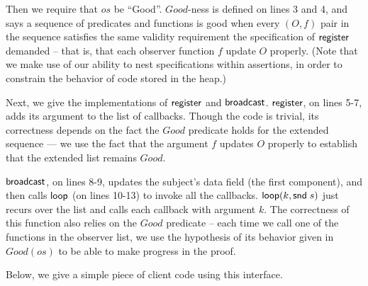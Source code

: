 Then we require that $os$ be ``Good''. $Good$-ness is defined on lines
3 and 4, and says a sequence of predicates and functions is good when
every $(O,f)$ pair in the sequence satisfies the same validity
requirement the specification of $\mathsf{register}$ demanded -- that
is, that each observer function $f$ update $O$ properly.  (Note that
we make use of our ability to nest specifications within assertions,
in order to constrain the behavior of code stored in the heap.)

Next, we give the implementations of $\mathsf{register}$ and
$\mathsf{broadcast}$. $\mathsf{register}$, on lines 5-7, adds its
argument to the list of callbacks. Though the code is trivial, its
correctness depends on the fact the $Good$ predicate holds for the
extended sequence --- we use the fact that the argument $f$ updates 
$O$ properly to establish that the extended list remains $Good$. 

$\mathsf{broadcast}$, on lines 8-9, updates the subject's data field
(the first component), and then calls $\mathsf{loop}$ (on lines 10-13)
to invoke all the callbacks. $\mathsf{loop}(k, \mathsf{snd}\; s)$ just recurs
over the list and calls each callback with argument $k$. The
correctness of this function also relies on the $Good$ predicate --
each time we call one of the functions in the observer list, we use
the hypothesis of its behavior given in $Good(os)$ to be able to make
progress in the proof.


Below, we give a simple piece of client code using this interface.



